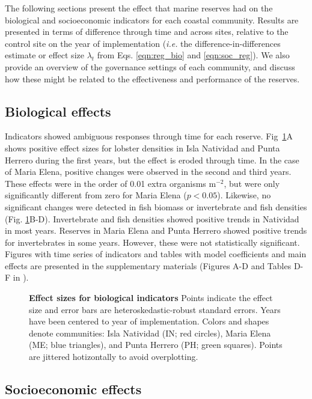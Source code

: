\documentclass[10pt,letterpaper]{article}
\begin{document}
The following sections present the effect that marine reserves had on the biological and socioeconomic indicators for each coastal community. Results are presented in terms of difference through time and across sites, relative to the control site on the year of implementation (\emph{i.e.} the difference-in-differences estimate or effect size $\lambda_t$ from Eqs. \ref{eqn:reg_bio} and \ref{eqn:soc_reg}). We also provide an overview of the governance settings of each community, and discuss how these might be related to the effectiveness and performance of the reserves.

\subsection*{Biological effects}

Indicators showed ambiguous responses through time for each reserve. Fig~\ref{fig:indicators}A shows positive effect sizes for lobster densities in Isla Natividad and Punta Herrero during the first years, but the effect is eroded through time. In the case of Maria Elena, positive changes were observed in the second and third years. These effects were in the order of 0.01 extra organisms $\mathrm{m}^{-2}$, but were only significantly different from zero for Maria Elena ($p < 0.05$). Likewise, no significant changes were detected in fish biomass or invertebrate and fish densities (Fig. \ref{fig:indicators}B-D). Invertebrate and fish densities showed positive trends in Natividad in most years. Reserves in Maria Elena and Punta Herrero showed positive trends for invertebrates in some years. However, these were not statistically significant. Figures with time series of indicators and tables with model coefficients and main effects are presented in the supplementary materials (Figures A-D and Tables D-F in ).

\begin{figure}[h]
\centering
\caption{{\bf Effect sizes for biological indicators}
Points indicate the effect size and error bars are heteroskedastic-robust standard errors. Years have been centered to year of implementation. Colors and shapes denote communities: Isla Natividad (IN; red circles), Maria Elena (ME; blue triangles), and Punta Herrero (PH; green squares). Points are jittered hotizontally to avoid overplotting.}
\label{fig:indicators}
\end{figure}

\subsection*{Socioeconomic effects}
\end{document}
